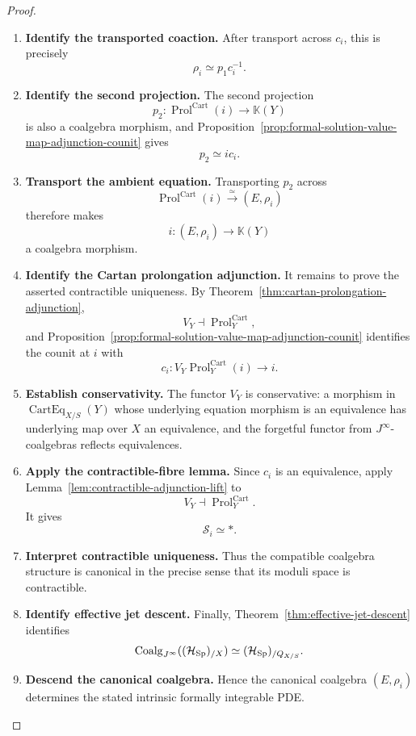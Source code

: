 \begin{proof}
\begin{enumerate}[label=\textup{(\arabic*)}]
    \item \textbf{Identify the transported coaction.}
After transport across \(c_i\), this is precisely
\[
  \rho_i\simeq p_1c_i^{-1}.
\]

    \item \textbf{Identify the second projection.}
The second projection
\[
  p_2:\operatorname{Prol}^{\mathrm{Cart}}(i)\to\mathbb K(Y)
\]
is also a coalgebra morphism, and
Proposition~\ref{prop:formal-solution-value-map-adjunction-counit} gives
\[
  p_2\simeq ic_i.
\]

    \item \textbf{Transport the ambient equation.}
Transporting \(p_2\) across
\[
  \operatorname{Prol}^{\mathrm{Cart}}(i)\xrightarrow{\simeq}(E,\rho_i)
\]
therefore makes
\[
  i:(E,\rho_i)\to\mathbb K(Y)
\]
a coalgebra morphism.

    \item \textbf{Identify the Cartan prolongation adjunction.}
It remains to prove the asserted contractible uniqueness. By
Theorem~\ref{thm:cartan-prolongation-adjunction},
\[
  V_Y\dashv \operatorname{Prol}^{\mathrm{Cart}}_Y,
\]
and
Proposition~\ref{prop:formal-solution-value-map-adjunction-counit} identifies the counit at
\(i\) with
\[
  c_i:V_Y\operatorname{Prol}^{\mathrm{Cart}}_Y(i)\to i.
\]

    \item \textbf{Establish conservativity.}
The functor \(V_Y\) is conservative: a morphism in \(\operatorname{CartEq}_{X/S}(Y)\)
whose underlying equation morphism is an equivalence has underlying
map over \(X\) an equivalence, and the forgetful functor from
\(J^\infty\)-coalgebras reflects equivalences.

    \item \textbf{Apply the contractible-fibre lemma.}
Since \(c_i\) is an equivalence, apply
Lemma~\ref{lem:contractible-adjunction-lift} to
\[
  V_Y\dashv \operatorname{Prol}^{\mathrm{Cart}}_Y.
\]
It gives
\[
  \mathcal S_i\simeq *.
\]

    \item \textbf{Interpret contractible uniqueness.}
Thus the compatible coalgebra structure is canonical in the precise sense that
its moduli space is contractible.

    \item \textbf{Identify effective jet descent.}
Finally,
Theorem~\ref{thm:effective-jet-descent} identifies
\[
  \operatorname{Coalg}_{J^\infty}((\mathcal H_{\operatorname{Sp}})_{/X})
  \simeq
  (\mathcal H_{\operatorname{Sp}})_{/Q_{X/S}}.
\]

    \item \textbf{Descend the canonical coalgebra.}
Hence the canonical coalgebra \((E,\rho_i)\) determines the stated intrinsic
formally integrable PDE.
\end{enumerate}
\end{proof}

